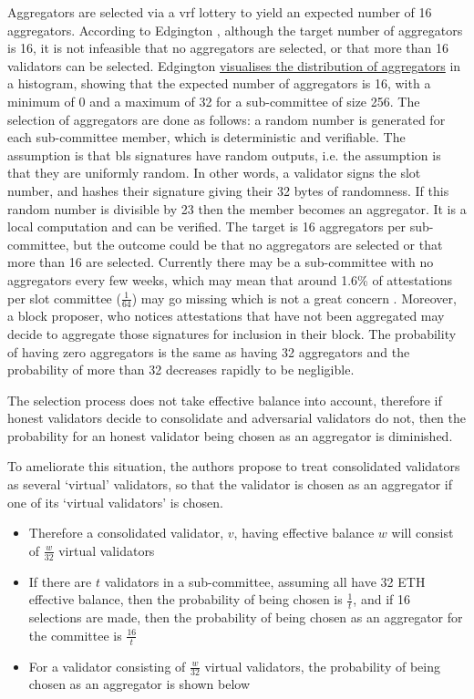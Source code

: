 \documentclass{article}
\begin{document}
Aggregators are selected via a \gls{vrf} lottery to yield an expected number of 16 aggregators. According to Edgington \cite{Edgington2023}, although the target number of aggregators is 16, it is not infeasible that no aggregators are selected, or that more than 16 validators can be selected. Edgington \href{https://eth2book.info/capella/part2/building_blocks/aggregator/}{visualises the distribution of aggregators} in a histogram, showing that the expected number of aggregators is 16, with a minimum of 0 and a maximum of 32 for a sub-committee of size 256. The selection of aggregators are done as follows: a random number is generated for each sub-committee member, which is deterministic and verifiable. The assumption is that \gls{bls} signatures have random outputs, i.e. the assumption is that they are uniformly random. In other words, a validator signs the slot number, and hashes their signature giving their 32 bytes of randomness. If this random number is divisible by 23 then the member becomes an aggregator. It is a local computation and can be verified. The target is 16 aggregators per sub-committee, but the outcome could be that no aggregators are selected or that more than 16 are selected. Currently there may be a sub-committee with no aggregators every few weeks, which may mean that around 1.6\% of attestations per slot committee ($\frac{1}{64}$) may go missing which is not a great concern \cite{Edgington2023}.  Moreover, a block proposer, who notices attestations that have not been aggregated may decide to aggregate those signatures for inclusion in their block. The probability of having zero aggregators is the same as having 32 aggregators and the probability of more than 32 decreases rapidly to be negligible.


The selection process does not take effective balance into account, therefore if honest validators decide to consolidate and adversarial validators do not, then the probability for an honest validator being chosen as an aggregator is diminished.  

To ameliorate this situation, the authors propose to treat consolidated
validators as several `virtual' validators, so that the validator is chosen as
an aggregator if one of its `virtual validators' is chosen.

\begin{itemize}
  \item Therefore a consolidated validator, $v$, having effective balance $w$
    will consist of $\frac{w}{32}$ virtual validators
  \item If there are $t$ validators in a sub-committee, assuming all have 32
    ETH effective balance, then the probability of being chosen is
    $\frac{1}{t}$, and if 16 selections are made, then the probability of being
    chosen as an aggregator for the committee is $\frac{16}{t}$
  \item For a validator consisting of $\frac{w}{32}$ virtual validators, the
    probability of being chosen as an aggregator is shown below
\end{itemize}
\end{document}
